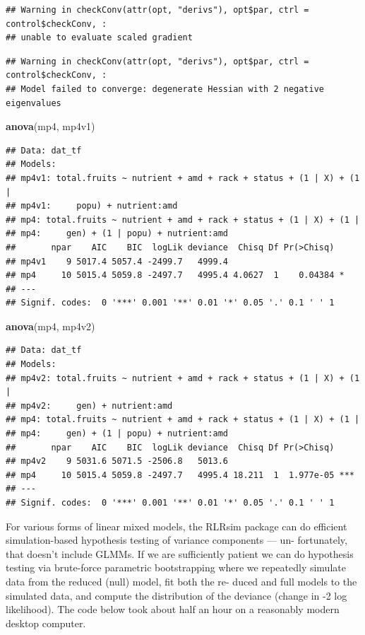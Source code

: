 \documentclass[
  12pt,
]{book}
\newenvironment{Shaded}{\begin{snugshade}}{\end{snugshade}}
\newcommand{\KeywordTok}[1]{\textcolor[rgb]{0.13,0.29,0.53}{\textbf{#1}}}
\newcommand{\NormalTok}[1]{#1}
\begin{document}
\begin{verbatim}
## Warning in checkConv(attr(opt, "derivs"), opt$par, ctrl = control$checkConv, :
## unable to evaluate scaled gradient
\end{verbatim}

\begin{verbatim}
## Warning in checkConv(attr(opt, "derivs"), opt$par, ctrl = control$checkConv, :
## Model failed to converge: degenerate Hessian with 2 negative eigenvalues
\end{verbatim}

\begin{Shaded}
\begin{Highlighting}[]
\KeywordTok{anova}\NormalTok{(mp4, mp4v1)}
\end{Highlighting}
\end{Shaded}

\begin{verbatim}
## Data: dat_tf
## Models:
## mp4v1: total.fruits ~ nutrient + amd + rack + status + (1 | X) + (1 | 
## mp4v1:     popu) + nutrient:amd
## mp4: total.fruits ~ nutrient + amd + rack + status + (1 | X) + (1 | 
## mp4:     gen) + (1 | popu) + nutrient:amd
##       npar    AIC    BIC  logLik deviance  Chisq Df Pr(>Chisq)  
## mp4v1    9 5017.4 5057.4 -2499.7   4999.4                       
## mp4     10 5015.4 5059.8 -2497.7   4995.4 4.0627  1    0.04384 *
## ---
## Signif. codes:  0 '***' 0.001 '**' 0.01 '*' 0.05 '.' 0.1 ' ' 1
\end{verbatim}

\begin{Shaded}
\begin{Highlighting}[]
\KeywordTok{anova}\NormalTok{(mp4, mp4v2)}
\end{Highlighting}
\end{Shaded}

\begin{verbatim}
## Data: dat_tf
## Models:
## mp4v2: total.fruits ~ nutrient + amd + rack + status + (1 | X) + (1 | 
## mp4v2:     gen) + nutrient:amd
## mp4: total.fruits ~ nutrient + amd + rack + status + (1 | X) + (1 | 
## mp4:     gen) + (1 | popu) + nutrient:amd
##       npar    AIC    BIC  logLik deviance  Chisq Df Pr(>Chisq)    
## mp4v2    9 5031.6 5071.5 -2506.8   5013.6                         
## mp4     10 5015.4 5059.8 -2497.7   4995.4 18.211  1  1.977e-05 ***
## ---
## Signif. codes:  0 '***' 0.001 '**' 0.01 '*' 0.05 '.' 0.1 ' ' 1
\end{verbatim}

For various forms of linear mixed models, the RLRsim package can do efficient simulation-based hypothesis testing of variance components --- un- fortunately, that doesn't include GLMMs. If we are sufficiently patient we can do hypothesis testing via brute-force parametric bootstrapping where we repeatedly simulate data from the reduced (null) model, fit both the re- duced and full models to the simulated data, and compute the distribution of the deviance (change in -2 log likelihood). The code below took about half an hour on a reasonably modern desktop computer.
\end{document}
